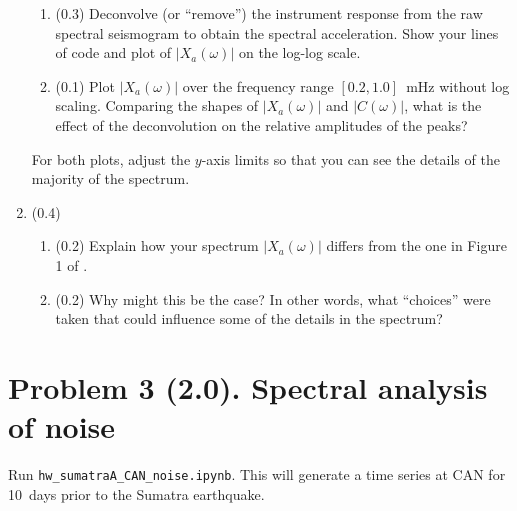 \documentclass[11pt,titlepage,fleqn]{article}
\newcommand{\tfilenoise}{{\tt hw\_sumatraA\_CAN\_noise.ipynb}}
\begin{document}
\begin{enumerate}
\begin{enumerate}
\item (0.3) Deconvolve (or ``remove'') the instrument response from the raw spectral seismogram to obtain the spectral acceleration. Show your lines of code and plot of $|X_a(\omega)|$ on the log-log scale.
\item (0.1) Plot $|X_a(\omega)|$ over the frequency range $[0.2,1.0]$~mHz without log scaling. Comparing the shapes of $|X_a(\omega)|$ and $|C(\omega)|$, what is the effect of the deconvolution on the relative amplitudes of the peaks?
\end{enumerate}
%
For both plots, adjust the $y$-axis limits so that you can see the details of the majority of the spectrum.


\item (0.4) \ptag\ 
%
\begin{enumerate}
\item (0.2) Explain how your spectrum $|X_a(\omega)|$ differs from the one in Figure 1 of \citet{Park2005}.
\item (0.2) Why might this be the case? In other words, what ``choices'' were taken that could influence some of the details in the spectrum?
\end{enumerate}

\end{enumerate}


\pagebreak
\section*{Problem 3 (2.0). Spectral analysis of noise}

Run \tfilenoise. This will generate a time series at CAN for 10~days prior to the Sumatra earthquake.
\end{document}

